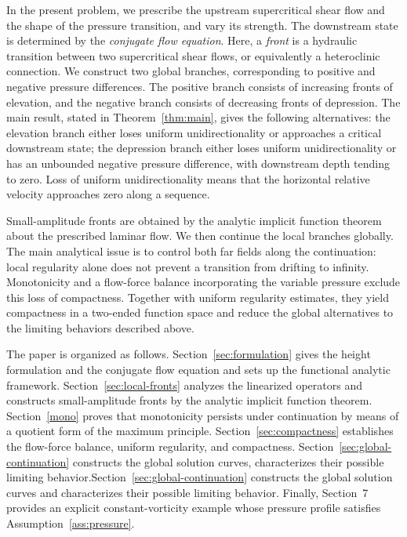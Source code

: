 \documentclass[12pt,letterpaper]{amsart}
\numberwithin{equation}{section}
\begin{document}
{In the present problem, we prescribe the upstream supercritical shear flow and the shape of the pressure transition, and vary its strength. The downstream state is determined by the \emph{conjugate flow equation}. Here, a \emph{front} is a hydraulic transition between two supercritical shear flows, or equivalently a heteroclinic connection. We construct two global branches, corresponding to positive and negative pressure differences. The positive branch consists of increasing fronts of elevation, and the negative branch consists of decreasing fronts of depression. The main result, stated in Theorem~\ref{thm:main}, gives the following alternatives: the elevation branch either loses uniform unidirectionality or approaches a critical downstream state; the depression branch either loses uniform unidirectionality or has an unbounded negative pressure difference, with downstream depth tending to zero. Loss of uniform unidirectionality means that the horizontal relative velocity approaches zero along a sequence.

Small-amplitude fronts are obtained by the analytic implicit function theorem about the prescribed laminar flow. We then continue the local branches globally. The main analytical issue is to control both far fields along the continuation: local regularity alone does not prevent a transition from drifting to infinity. Monotonicity and a flow-force balance incorporating the variable pressure exclude this loss of compactness. Together with uniform regularity estimates, they yield compactness in a two-ended function space and reduce the global alternatives to the limiting behaviors described above.}

The paper is organized as follows. Section~\ref{sec:formulation} gives the height formulation and the conjugate flow equation and sets up the functional analytic framework. Section~\ref{sec:local-fronts} analyzes the linearized operators and constructs small-amplitude fronts by the analytic implicit function theorem. Section~\ref{mono} proves that monotonicity persists under continuation by means of a quotient form of the maximum principle. Section~\ref{sec:compactness} establishes the flow-force balance, uniform regularity, and compactness. Section~\ref{sec:global-continuation} constructs the global solution curves, characterizes their possible limiting behavior.Section~\ref{sec:global-continuation} constructs the global solution curves and characterizes their possible limiting behavior. Finally, Section~7 provides an explicit constant-vorticity example whose pressure profile satisfies Assumption~\ref{ass:pressure}.
\end{document}
